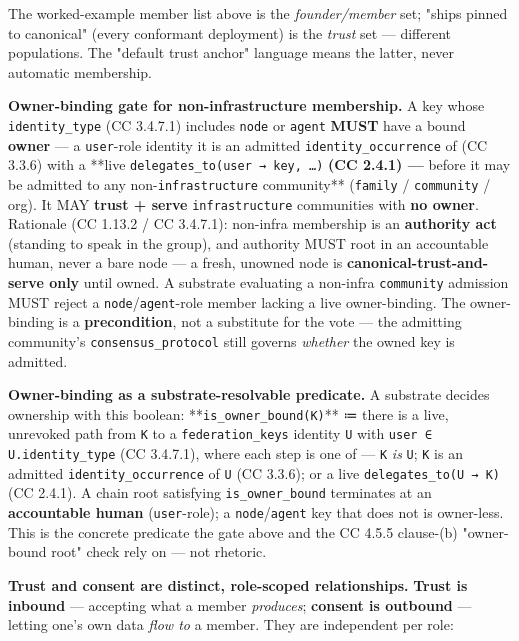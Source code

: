 \documentclass[11pt]{article}
\begin{document}
The worked-example member list above is the \textit{founder/member} set; "ships pinned to canonical" (every conformant deployment) is the \textit{trust} set — different populations. The "default trust anchor" language means the latter, never automatic membership.


\textbf{Owner-binding gate for non-infrastructure membership.} A key whose \texttt{identity\_type} (CC 3.4.7.1) includes \texttt{node} or \texttt{agent} \textbf{MUST} have a bound \textbf{owner} — a \texttt{user}-role identity it is an admitted \texttt{identity\_occurrence} of (CC 3.3.6) with a **live \texttt{delegates\_to(user → key, …)}\textbf{ (CC 2.4.1) — }before it may be admitted to any non-\texttt{infrastructure} community** (\texttt{family} / \texttt{community} / org). It MAY \textbf{trust + serve} \texttt{infrastructure} communities with \textbf{no owner}. Rationale (CC 1.13.2 / CC 3.4.7.1): non-infra membership is an \textbf{authority act} (standing to speak in the group), and authority MUST root in an accountable human, never a bare node — a fresh, unowned node is \textbf{canonical-trust-and-serve only} until owned. A substrate evaluating a non-infra \texttt{community} admission MUST reject a \texttt{node}/\texttt{agent}-role member lacking a live owner-binding. The owner-binding is a \textbf{precondition}, not a substitute for the vote — the admitting community's \texttt{consensus\_protocol} still governs \textit{whether} the owned key is admitted.


\textbf{Owner-binding as a substrate-resolvable predicate.} A substrate decides ownership with this boolean: **\texttt{is\_owner\_bound(K)}** ≔ there is a live, unrevoked path from \texttt{K} to a \texttt{federation\_keys} identity \texttt{U} with \texttt{user ∈ U.identity\_type} (CC 3.4.7.1), where each step is one of — \texttt{K} \textit{is} \texttt{U}; \texttt{K} is an admitted \texttt{identity\_occurrence} of \texttt{U} (CC 3.3.6); or a live \texttt{delegates\_to(U → K)} (CC 2.4.1). A chain root satisfying \texttt{is\_owner\_bound} terminates at an \textbf{accountable human} (\texttt{user}-role); a \texttt{node}/\texttt{agent} key that does not is owner-less. This is the concrete predicate the gate above and the CC 4.5.5 clause-(b) "owner-bound root" check rely on — not rhetoric.


\textbf{Trust and consent are distinct, role-scoped relationships.} \textbf{Trust is inbound} — accepting what a member \textit{produces}; \textbf{consent is outbound} — letting one's own data \textit{flow to} a member. They are independent per role:
\end{document}
